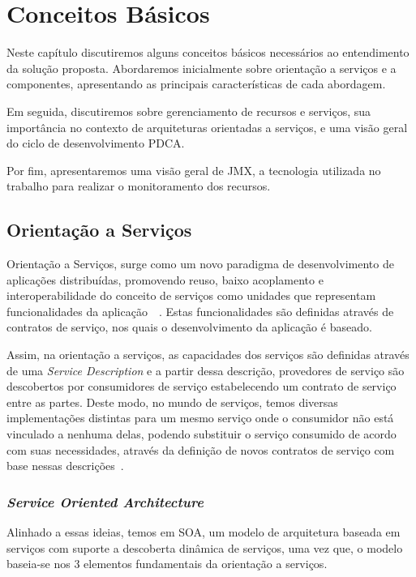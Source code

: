 \chapter{Conceitos Básicos}
\label{ch:2}
Neste capítulo discutiremos alguns conceitos básicos necessários ao entendimento da solução proposta. Abordaremos inicialmente sobre orientação a serviços e a componentes, apresentando as principais características de cada abordagem. 

Em seguida, discutiremos sobre gerenciamento de recursos e serviços, sua importância no contexto de arquiteturas orientadas a serviços, e uma visão geral do ciclo de desenvolvimento PDCA. 

Por fim, apresentaremos uma visão geral de JMX, a tecnologia utilizada no trabalho para realizar o monitoramento dos recursos.

\section{Orientação a Serviços}
Orientação a Serviços, surge como um novo paradigma de desenvolvimento de aplicações distribuídas, promovendo reuso, baixo acoplamento e interoperabilidade do conceito de serviços como unidades que representam funcionalidades da aplicação~\cite{erl2008soa}~\cite{cervantes2005technical}. Estas funcionalidades são definidas através de contratos de serviço, nos quais o desenvolvimento da aplicação é baseado.

Assim, na orientação a serviços, as capacidades dos serviços são definidas através de uma \textit{Service Description} e a partir dessa descrição, provedores de serviço são descobertos por consumidores de serviço estabelecendo um contrato de serviço entre as partes. Deste modo, no mundo de serviços, temos diversas implementações distintas para um mesmo serviço onde o consumidor não está vinculado a nenhuma delas, podendo substituir o serviço consumido de acordo com suas necessidades, através da definição de novos contratos de serviço com base nessas descrições~\cite{cervantes2005technical}.

\subsection{\textit{Service Oriented Architecture}}
Alinhado a essas ideias, temos em SOA, um modelo de arquitetura baseada em serviços com suporte a descoberta dinâmica de serviços, uma vez que, o modelo baseia-se nos 3 elementos fundamentais da orientação a serviços.


